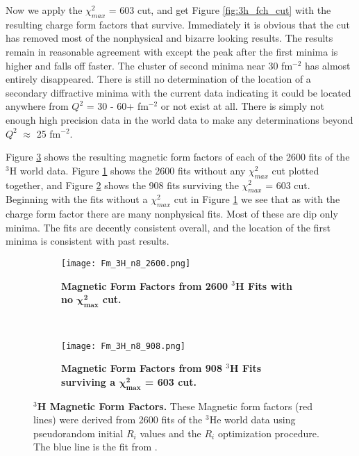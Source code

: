Now we apply the $\chi^2_{max}$ = 603 cut, and get Figure \ref{fig:3h_fch_cut} with the resulting charge form factors that survive. Immediately it is obvious that the cut has removed most of the nonphysical and bizarre looking results. The results remain in reasonable agreement with \cite{Article:Amroun} except the peak after the first minima is higher and falls off faster. The cluster of second minima near 30 fm$^{-2}$ has almost entirely disappeared. There is still no determination of the location of a secondary diffractive minima with the current data indicating it could be located anywhere from  $Q^2$ = 30 - 60+ fm$^{-2}$ or not exist at all. There is simply not enough high precision data in the world data to make any determinations beyond $Q^2$ $\approx$ 25 fm$^{-2}$.

Figure \ref{fig:3h_fm} shows the resulting magnetic form factors of each of the 2600 fits of the $^3$H world data. Figure \ref{fig:3h_fm_no_cut} shows the 2600 fits without any $\chi^2_{max}$ cut plotted together, and Figure \ref{fig:3h_fm_cut} shows the 908 fits surviving the $\chi^2_{max}$ = 603 cut. Beginning with the fits without a $\chi^2_{max}$ cut in Figure \ref{fig:3h_fm_no_cut} we see that as with the charge form factor there are many nonphysical fits. Most of these are dip only minima. The fits are decently consistent overall, and the location of the first minima is consistent with past results. 

\begin{figure}[!ht]
\begin{subfigure}{1.\textwidth}
  \centering
  \texttt{[image: Fm\_3H\_n8\_2600.png]}
  \caption{\bf{Magnetic Form Factors from 2600 $^3$H Fits with no $\boldsymbol{\chi^2_{max}}$ cut.}}
  \label{fig:3h_fm_no_cut}
\end{subfigure}\\
\begin{subfigure}{1.\textwidth}
  \centering
  \texttt{[image: Fm\_3H\_n8\_908.png]}
  \caption{\bf{Magnetic Form Factors from 908 $^3$H Fits surviving a $\boldsymbol{\chi^2_{max}}$ = 603 cut.}}
  \label{fig:3h_fm_cut}
\end{subfigure}
\caption[$^3$H Magnetic Form Factors] {
{\bf{$^3$H Magnetic Form Factors.}} These Magnetic form factors (red lines) were derived from 2600 fits of the $^3$He world data using pseudorandom initial $R_i$ values and the $R_i$ optimization procedure. The blue line is the fit from \cite{Article:Amroun}.}
\label{fig:3h_fm}
\end{figure}

